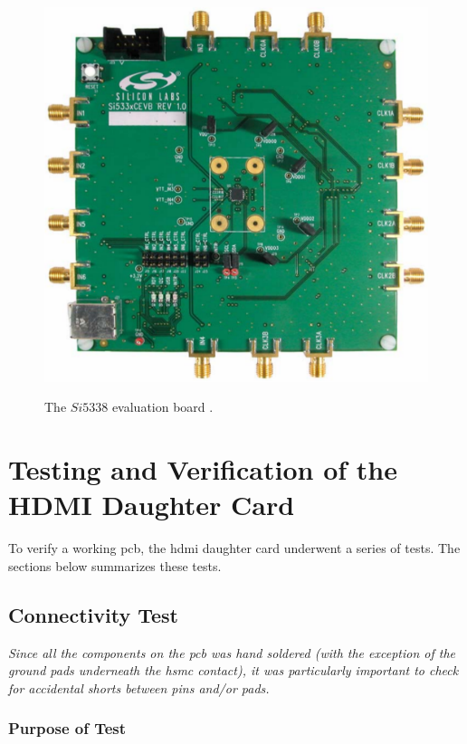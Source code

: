 \documentclass[main.tex]{subfiles}
\begin{document}
\begin{figure} %
\begin{center}
\includegraphics[scale=0.5]{../img/si5338}  \\[0.1 cm]
\caption{The $Si5338$ evaluation board \cite{si16}.}
\label{fig:si5338}
\end{center}
\end{figure} 

\chapter{Testing and Verification of the HDMI Daughter Card}
To verify a working \gls{pcb}, the \gls{hdmi} daughter card underwent a series of tests. The sections below summarizes these tests. 

\section{Connectivity Test}

\textit{Since all the components on the \gls{pcb} was hand soldered (with the exception of the ground pads underneath the \gls{hsmc} contact), it was particularly important to check for accidental shorts between pins and/or pads.}

\subsection{Purpose of Test}
\end{document}
